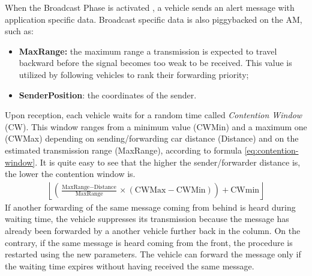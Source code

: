 		
		When the Broadcast Phase is activated , a vehicle sends an alert message with application specific data. Broadcast specific data is also piggybacked on the AM, such as:
		\begin{itemize}
			\item \textbf{MaxRange:} the maximum range a transmission is expected to travel backward before the signal becomes too weak to be received. This value is utilized by following vehicles to rank their forwarding priority;
			\item \textbf{SenderPosition}: the coordinates of the sender.
		\end{itemize}
		Upon reception, each vehicle waits for a random time called \textit{Contention Window} (CW). This window ranges from a minimum value (CWMin) and a maximum one (CWMax) depending on sending/forwarding car distance (Distance) and on the estimated transmission range (MaxRange), according to formula \ref{eq:contention-window}. It is quite easy to see that the higher the sender/forwarder distance is, the lower the contention window is.
		\begin{gather}
			\left\lfloor \left( \frac{\text{MaxRange} - \text{Distance}}{\text{MaxRange}} \times (\text{CWMax} - \text{CWMin}) \right) + \text{CWmin}  \right\rfloor
			\label{eq:contention-window}
		\end{gather}
		If another forwarding of the same message coming from behind is heard during waiting time, the vehicle suppresses its transmission because the message has already been forwarded by a another vehicle further back in the column. On the contrary, if the same message is heard coming from the front, the procedure is restarted using the new parameters. The vehicle can forward the message only if the waiting time expires without having received the same message.
		
		
		

